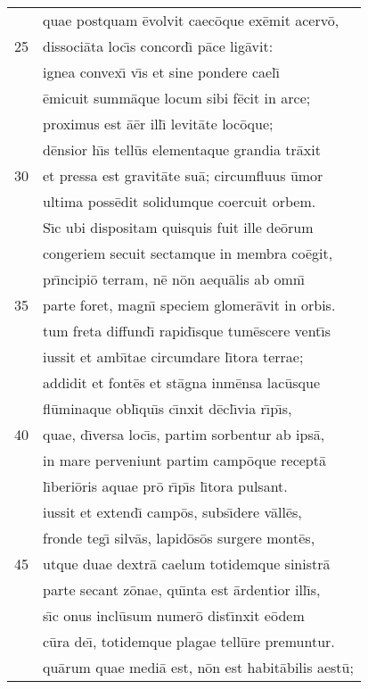 \documentclass[paper=6in:9in,pagesize=pdftex,
               headinclude=on,footinclude=on,12pt]{scrbook}
\begin{document}
\begin{longtable}[p]{ r l }
 & quae postquam \=evolvit caec\=oque ex\=emit acerv\=o,\\ 
25 & dissoci\=ata loc\={\i}s concord\={\i} p\=ace lig\=avit:\\ 
 & ignea convex\={\i} v\={\i}s et sine pondere cael\={\i}\\ 
 & \=emicuit summ\=aque locum sibi f\=ecit in arce;\\ 
 & proximus est \=a\=er ill\={\i} levit\=ate loc\=oque;\\ 
 & d\=ensior h\={\i}s tell\=us elementaque grandia tr\=axit\\ 
30 & et pressa est gravit\=ate su\=a; circumfluus \=umor\\ 
 & ultima poss\=edit solidumque coercuit orbem.\\ 
 & \indent S\={\i}c ubi dispositam quisquis fuit ille de\=orum\\ 
 & congeriem secuit sectamque in membra co\=egit,\\ 
 & pr\={\i}ncipi\=o terram, n\=e n\=on aequ\=alis ab omn\={\i}\\ 
35 & parte foret, magn\={\i} speciem glomer\=avit in orbis.\\ 
 & tum freta diffund\={\i} rapid\={\i}sque tum\=escere vent\={\i}s\\ 
 & iussit et amb\={\i}tae circumdare l\={\i}tora terrae;\\ 
 & addidit et font\=es et st\=agna inm\=ensa lac\=usque\\ 
 & fl\=uminaque obl\={\i}qu\={\i}s c\={\i}nxit d\=ecl\={\i}via r\={\i}p\={\i}s,\\ 
40 & quae, d\={\i}versa loc\={\i}s, partim sorbentur ab ips\=a,\\ 
 & in mare perveniunt partim camp\=oque recept\=a\\ 
 & l\={\i}beri\=oris aquae pr\=o r\={\i}p\={\i}s l\={\i}tora pulsant.\\ 
 & iussit et extend\={\i} camp\=os, subs\={\i}dere v\=all\=es,\\ 
 & fronde teg\={\i} silv\=as, lapid\=os\=os surgere mont\=es,\\ 
45 & utque duae dextr\=a caelum totidemque sinistr\=a\\ 
 & parte secant z\=onae, qu\={\i}nta est \=ardentior ill\={\i}s,\\ 
 & s\={\i}c onus incl\=usum numer\=o dist\={\i}nxit e\=odem\\ 
 & c\=ura de\={\i}, totidemque plagae tell\=ure premuntur.\\ 
 & qu\=arum quae medi\=a est, n\=on est habit\=abilis aest\=u;\\ 

\end{longtable}
\end{document}
